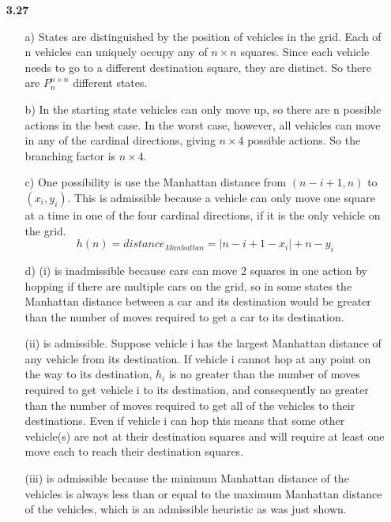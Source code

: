 \documentclass{article}
\begin{document}
\begin{enumerate}
\item[\textbf{3.27}]
\begin{enumerate}
\item[a)]
States are distinguished by the position of vehicles in the grid. Each of n vehicles can uniquely occupy any of 
$n \times n$ squares. Since each vehicle needs to go to a different destination square, they are distinct. So
there are $P^{n \times n}_n$ different states.
\item[b)]
In the starting state vehicles can only move up, so there are n possible actions in the best case.
In the worst case, however, all vehicles can move in any of the cardinal directions, giving $n \times 4$
possible actions. So the branching factor is $n \times 4$.
\item[c)]
One possibility is use the Manhattan distance from $(n-i+1,n)$ to $(x_i,y_i)$. This is admissible because
a vehicle can only move one square at a time in one of the four cardinal directions, if it is the only
vehicle on the grid.
\[
h(n) = distance_{Manhattan} = |n-i+1-x_i|+n-y_i
\]
\item[d)]
(i) is inadmissible because cars can move 2 squares in one action by hopping if there are multiple cars on the
grid, so in some states the Manhattan distance between a car and its destination would be greater than the number
of moves required to get a car to its destination.

(ii) is admissible. Suppose vehicle i has the largest Manhattan distance of any vehicle from its destination.
If vehicle i cannot hop at any point on the way to its destination, $h_i$ is
no greater than the number of moves required to get vehicle i to its destination, and consequently no greater
than the number of moves required to get all of the vehicles to their destinations. Even if vehicle i can hop
this means that some other vehicle(s) are not at their destination squares and will require at least one move
each to reach their destination squares.

(iii) is admissible because the minimum Manhattan distance of the vehicles is always less than or equal to the
maximum Manhattan distance of the vehicles, which is an admissible heuristic as was just shown.
\end{enumerate}
\end{enumerate}
\end{document}
